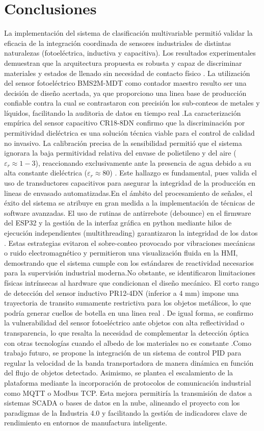 \documentclass[conference]{IEEEtran}
\begin{document}
\section{Conclusiones}
La implementación del sistema de clasificación multivariable permitió validar la eficacia de la integración coordinada de sensores industriales de distintas naturalezas (fotoeléctrica, inductiva y capacitiva). Los resultados experimentales demuestran que la arquitectura propuesta es robusta y capaz de discriminar materiales y estados de llenado sin necesidad de contacto físico \cite{sensores_3}. La utilización del sensor fotoeléctrico  BMS2M-MDT como contador maestro resulto ser una decisión de diseño acertada, ya que proporciono una linea base de producción confiable contra la cual se contrastaron con precisión los sub-conteos de metales y líquidos, facilitando la auditoria de datos en tiempo real \cite{sensores_14}.La caracterización empírica del sensor capacitivo CR18-8DN confirmo que la discriminación por permitividad dieléctrica es una solución técnica viable para el control de calidad no invasivo. La calibración precisa de la sensibilidad permitió que el sistema ignorara la baja permitividad relativa del envase de polietileno y del aire ($\varepsilon_r \approx 1-3$), reaccionando exclusivamente ante la presencia de agua debido a su alta constante dieléctrica ($\varepsilon_r \approx 80$) \cite{sensores_16}. Este hallazgo es fundamental, pues valida el uso de transductores capacitivos para asegurar la integridad de la producción en lineas de envasado automatizadas.En el ámbito del procesamiento de señales, el éxito del sistema se atribuye en gran medida a la implementación de técnicas de software avanzadas. El uso de rutinas de antirrebote (debounce) en el firmware del ESP32 y la gestión de la interfaz gráfica en python mediante hilos de ejecución independientes (multithreading) garantizaron la integridad de los datos \cite{sensores_20}. Estas estrategias evitaron el sobre-conteo provocado por vibraciones mecánicas o ruido electromagnético y permitieron una visualización fluida en la HMI, demostrando que el sistema cumple con los estándares de reactividad necesarios para la supervisión industrial moderna.No obstante, se identificaron limitaciones físicas intrínsecas al hardware que condicionan el diseño mecánico. El corto rango de detección del sensor inductivo PR12-4DN (inferior a 4 mm) impone una trayectoria de transito sumamente restrictiva para los objetos metálicos, lo que podría generar cuellos de botella en una linea real \cite{sensores_5}. De igual forma, se confirmo la vulnerabilidad del sensor fotoeléctrico ante objetos con alta reflectividad o transparencia, lo que resalta la necesidad de complementar la detección óptica con otras tecnologías cuando el albedo de los materiales no es constante \cite{sensores_11}.Como trabajo futuro, se propone la integración de un sistema de control PID para regular la velocidad de la banda transportadora de manera dinámica en función del flujo de objetos detectado. Asimismo, se plantea el escalamiento de la plataforma mediante la incorporación de protocolos de comunicación industrial como MQTT o Modbus TCP. Esta mejora permitiría la transmisión de datos a sistemas SCADA o bases de datos en la nube, alineando el proyecto con los paradigmas de la Industria 4.0 y facilitando la gestión de indicadores clave de rendimiento en entornos de manufactura inteligente.



\end{document}

